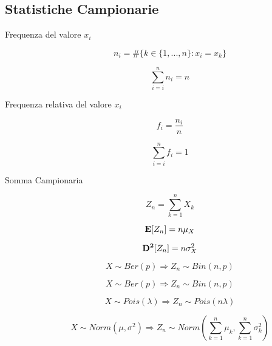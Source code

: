 \subsection{Statistiche Campionarie}
\begin{description}
	
	\item[Frequenza del valore $x_{i}$]
		\begin{equation}
		n_{i} = \#\{k\in\{1,...,n\}: x_{i}=x_{k}\}
		\end{equation}
		
		\begin{equation}
		\sum_{i=i}^{n} n_{i} = n
		\end{equation}
	
	\item[Frequenza relativa del valore $x_{i}$]
		\begin{equation}
		f_{i} = \frac{n_{i}}{n}
		\end{equation}
		
		\begin{equation}
		\sum_{i=i}^{n} f_{i} = 1
		\end{equation}
	
	\item[Somma Campionaria]
		\begin{equation}
		Z_{n} = \sum_{k=1}^{n}X_{k}
		\end{equation}
		
		\begin{equation}
		\mathbf{E}[Z_{n}] = n\mu_{X}
		\end{equation}
		
		\begin{equation}
		\mathbf{D^{2}}[Z_{n}] = n\sigma_{X}^{2}
		\end{equation}
		
		\begin{equation}
		X \sim Ber(p) \Rightarrow Z_{n} \sim Bin(n,p)
		\end{equation}
		
		\begin{equation}
		X \sim Ber(p) \Rightarrow Z_{n} \sim Bin(n,p)
		\end{equation}
		
		\begin{equation}
		X \sim Pois(\lambda) \Rightarrow Z_{n} \sim Pois(n\lambda)
		\end{equation}
		
		\begin{equation}
		X \sim Norm(\mu,\sigma^{2}) \Rightarrow Z_{n} \sim Norm(\sum_{k=1}^{n}\mu_{k}, \sum_{k=1}^{n} \sigma_{k}^{2})
		\end{equation}
		

\end{description}
